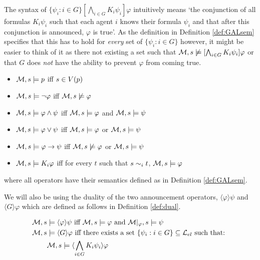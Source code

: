The syntax of $\{\psi_i: i\in G\}[\bigwedge_{i\in G}K_i\psi_i]\varphi$ intuitively means `the conjunction of all formulas $K_i\psi_i$ such that each agent $i$ knows their formula $\psi_i$ and that after this conjunction is announced, $\varphi$ is true'. As the definition in Definition \ref{def:GALsem} specifies that this has to hold for \textit{every} set of $\{\psi_i : i\in G\}$ however, it might be easier to think of it as there not existing a set such that $\mathcal{M},s \not\models [\bigwedge_{i\in G}K_i\psi_i]\varphi$ or that $G$ does \textit{not} have the ability to prevent $\varphi$ from coming true.

\begin{definition} \hfill
	\label{def:langel}
	\begin{itemize}
		\item[] $\mathcal{M},s \models p $ iff $ s \in V(p)$
		\item[] $\mathcal{M},s \models \neg\varphi$ iff $ \mathcal{M},s \not\models \varphi$
		\item[] $\mathcal{M},s \models \varphi \wedge \psi $ iff $ \mathcal{M},s \models \varphi $ and $ \mathcal{M},s \models \psi$
		\item[] $\mathcal{M},s \models \varphi \vee \psi $ iff $ \mathcal{M},s \models \varphi $ or $ \mathcal{M},s \models \psi$
		\item[] $\mathcal{M},s \models \varphi \rightarrow \psi $ iff $ \mathcal{M},s \not\models \varphi $ or $ \mathcal{M},s \models \psi$
		\item[] $\mathcal{M},s \models K_i\varphi $ iff for every $t$ such that $s\sim_{i}t$, $\mathcal{M},s \models \varphi$
	\end{itemize}
	where all operators have their semantics defined as in Definition \ref{def:GALsem}.
\end{definition}

We will also be using the duality of the two announcement operators, $\langle\varphi\rangle\psi$ and $\langle G\rangle\varphi$ which are defined as follows in Definition \ref{def:dual}.

\begin{definition} \hfill
	\label{def:dual}
	\begin{align*}
		\mathcal{M},s &\models \langle\varphi\rangle\psi\textrm{ iff }\mathcal{M},s \models \varphi\textrm{ and }\mathcal{M}|_\varphi,s \models \psi \\
		\mathcal{M},s &\models \langle G\rangle\varphi \textrm{ iff there exists a set }\{\psi_i:i\in G\} \subseteq \textrm{$\mathcal{L}_{el}$ such that: }\\
			   &\mathcal{M},s \models \langle\bigwedge_{i\in G}K_i\psi_i\rangle\varphi
	\end{align*}

\end{definition}

